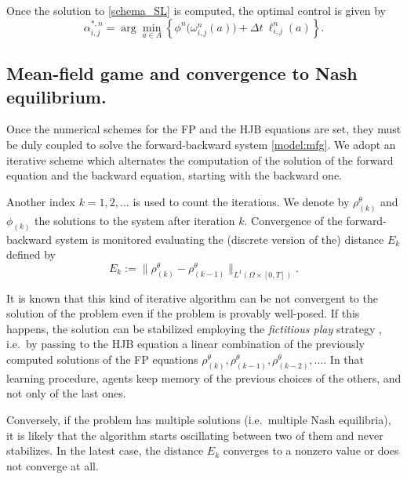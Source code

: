 \documentclass{cmslatex}
\newcommand{\alphastar}{\alpha^*}
\renewcommand{\r}{\rho}
\newcommand{\Dt}{\Delta t}
\begin{document}
Once the solution to \eqref{schema_SL} is computed, the optimal control is given by
\begin{equation}\label{synthesis_numerics}
\alpha^{*,n}_{i,j}=\arg\min\limits_{a\in A}\left\{\phi^n\big(\omega^n_{i,j}(a)\big)+\Dt \ \ell^n_{i,j}(a)\right\}.
\end{equation}
%
%
%
%
%
%
\subsection{Mean-field game and convergence to Nash equilibrium.}\label{sec:convergence}
Once the numerical schemes for the FP and the HJB equations are set, they must be duly coupled to solve the forward-backward system \eqref{model:mfg}.
We adopt an iterative scheme which alternates the computation of the solution of the forward equation and the backward equation, starting with the backward one. 
\begin{center}
\end{center}

Another index $k=1,2,\ldots$ is used to count the iterations. 
We denote by $\rho_{(k)}^\theta$ and $\phi_{(k)}$ the solutions to the system after iteration $k$. 
Convergence of the forward-backward system is monitored evaluating the (discrete version of the) distance $E_k$ defined by 
\begin{equation}\label{def:Ek}
E_k:=\|\r_{(k)}^\theta-\r_{(k-1)}^\theta\|_{L^1(\Omega\times[0,T])}.
\end{equation}

It is known that this kind of iterative algorithm can be not convergent to the solution of the problem even if the problem is provably well-posed. 
If this happens, the solution can be stabilized employing the \emph{fictitious play} strategy  \cite{brown1951,cardaliaguet2017}, i.e.\ by passing to the HJB equation a linear combination of the previously computed solutions of the FP equations $\r_{(k)}^\theta,\r_{(k-1)}^\theta,\r_{(k-2)}^\theta,\ldots$. 
In that learning procedure, agents keep memory of the previous choices of the others, and not only of the last ones.

Conversely, if the problem has multiple solutions (i.e.\ multiple Nash equilibria), it is likely that the algorithm starts oscillating between two of them and never stabilizes. In the latest case, the distance $E_k$ converges to a nonzero value or does not converge at all.
\end{document}
